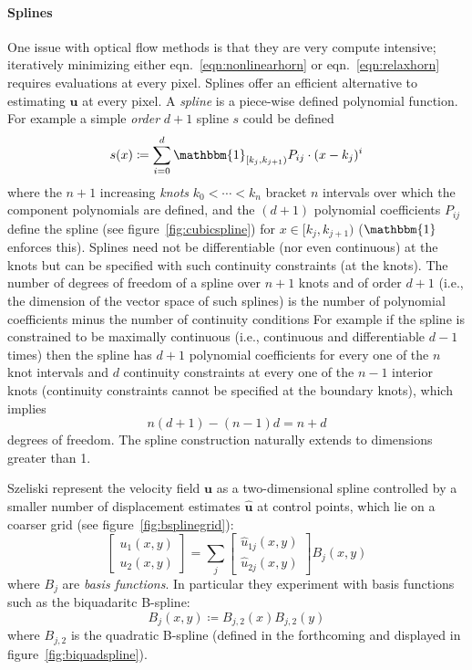 \paragraph{Splines}

One issue with optical flow methods is that they are very compute intensive; iteratively minimizing either eqn.~\eqref{eqn:nonlinearhorn} or eqn.~\eqref{eqn:relaxhorn} requires evaluations at every pixel.
%
Splines offer an efficient alternative to estimating \(\mathbf{u}\) at every pixel.
%
A \textit{spline} is a piece-wise defined polynomial function. For example a simple \textit{order} \(d+1\) spline \(s\) could be defined
\[
		s(x) \coloneqq \sum_{i=0}^d \mathbbm{1}_{[k_j, k_{j+1})}P_{ij} \cdot (x - k_j)^i
\]
where the \(n+1\) increasing \textit{knots} \(k_0 < \cdots < k_n\) bracket \(n\) intervals over which the component polynomials are defined, and the \((d+1)\) polynomial coefficients \(P_{ij}\) define the spline (see figure~\ref{fig:cubicspline}) for \(x \in [k_j, k_{j+1})\) (\(\mathbbm{1}\) enforces this).
%
Splines need not be differentiable (nor even continuous) at the knots but can be specified with such continuity constraints (at the knots).
%
The number of degrees of freedom of a spline over \(n+1\) knots and of order \(d+1\) (i.e., the dimension of the vector space of such splines) is the number of polynomial coefficients minus the number of continuity conditions
%
For example if the spline is constrained to be maximally continuous (i.e., continuous and differentiable \(d-1\) times) then the spline has \(d+1\) polynomial coefficients for every one of the \(n\) knot intervals and \(d\) continuity constraints at every one of the \(n-1\) interior knots (continuity constraints cannot be specified at the boundary knots), which implies 
\[
	n(d+1) - (n-1)d = n+d
\]
degrees of freedom. The spline construction naturally extends to dimensions greater than 1.

Szeliski \etal  \cite{szeliski1997spline} represent the velocity field \(\mathbf{u}\) as a two-dimensional spline controlled by a smaller number of displacement estimates \(\hat{\mathbf{u}}\) at control points, which lie on a coarser grid (see figure~\ref{fig:bsplinegrid}):
%
\begin{equation}
	\begin{bmatrix}
		u_1(x,y) \\ u_2(x,y)
	\end{bmatrix} = \sum_j \begin{bmatrix}
		\hat{u}_{1j}(x,y) \\ \hat{u}_{2j}(x,y)
	\end{bmatrix} B_j(x, y)
\end{equation}
where \(B_j\) are \textit{basis functions}. 
%
In particular they experiment with basis functions such as the biquadaritc B-spline:
\[
	B_j(x,y) \coloneqq B_{j,2}(x) B_{j,2}(y)
\]
where \(B_{j,2}\) is the quadratic B-spline (defined in the forthcoming and displayed in figure~\ref{fig:biquadspline}).

